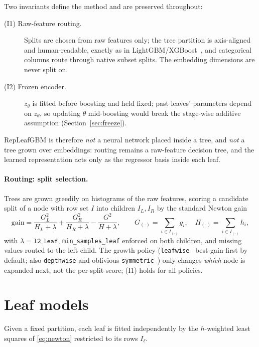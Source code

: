 \documentclass[11pt]{article}
\newcommand{\zt}{z_{\theta}}
\newcommand{\Il}{I_{\ell}}
\begin{document}
Two invariants define the method and are preserved throughout:
\begin{description}
\item[\textnormal{(I1) Raw-feature routing.}] Splits are chosen from raw features
  only; the tree partition is axis-aligned and human-readable, exactly as in
  LightGBM/XGBoost~\citep{ke2017lightgbm,chen2016xgboost}, and categorical columns
  route through native subset splits. The embedding dimensions are never split on.
\item[\textnormal{(I2) Frozen encoder.}] $\zt$ is fitted before boosting and held
  fixed; past leaves' parameters depend on $\zt$, so updating $\theta$ mid-boosting
  would break the stage-wise additive assumption (Section~\ref{sec:freeze}).
\end{description}
RepLeafGBM is therefore \emph{not} a neural network placed inside a tree, and
\emph{not} a tree grown over embeddings: routing remains a raw-feature decision tree,
and the learned representation acts only as the regressor basis inside each leaf.

\paragraph{Routing: split selection.}
Trees are grown greedily on histograms of the raw features, scoring a candidate split
of a node with row set $I$ into children $I_L, I_R$ by the standard Newton
gain~\citep{chen2016xgboost}
\begin{equation}
\mathrm{gain} = \frac{G_L^2}{H_L + \lambda} + \frac{G_R^2}{H_R + \lambda}
- \frac{G^2}{H + \lambda},
\qquad
G_{(\cdot)} = \!\!\sum_{i \in I_{(\cdot)}}\!\! g_i, \quad
H_{(\cdot)} = \!\!\sum_{i \in I_{(\cdot)}}\!\! h_i,
\label{eq:gain}
\end{equation}
with $\lambda = \texttt{l2\_leaf}$, \texttt{min\_samples\_leaf} enforced on both
children, and missing values routed to the left child. The growth policy
(\texttt{leafwise}~\citep{ke2017lightgbm} best-gain-first by default; also
\texttt{depthwise} and oblivious \texttt{symmetric}~\citep{prokhorenkova2018catboost})
only changes \emph{which} node is expanded next, not the per-split score; (I1) holds
for all policies.

\section{Leaf models}
\label{sec:leaves}

Given a fixed partition, each leaf is fitted independently by the $h$-weighted least
squares of \eqref{eq:newton} restricted to its rows $\Il$.
\end{document}
